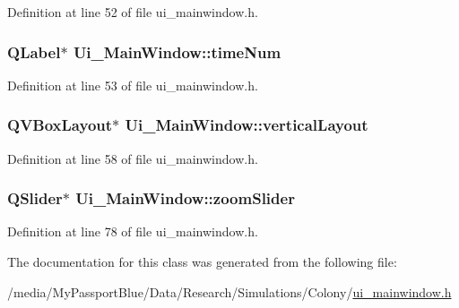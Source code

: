 \-Definition at line 52 of file ui\-\_\-mainwindow.\-h.

\hypertarget{class_ui___main_window_a260f2ffc3170b0afd4162f5300f7153e}{
\subsubsection[{time\-Num}]{\setlength{\rightskip}{0pt plus 5cm}\-Q\-Label$\ast$ {\bf \-Ui\-\_\-\-Main\-Window\-::time\-Num}}}\label{class_ui___main_window_a260f2ffc3170b0afd4162f5300f7153e}


\-Definition at line 53 of file ui\-\_\-mainwindow.\-h.

\hypertarget{class_ui___main_window_aecd96a04789fcfec3f98d80390ad8184}{
\subsubsection[{vertical\-Layout}]{\setlength{\rightskip}{0pt plus 5cm}\-Q\-V\-Box\-Layout$\ast$ {\bf \-Ui\-\_\-\-Main\-Window\-::vertical\-Layout}}}\label{class_ui___main_window_aecd96a04789fcfec3f98d80390ad8184}


\-Definition at line 58 of file ui\-\_\-mainwindow.\-h.

\hypertarget{class_ui___main_window_a396d443a9748adbeed2928fce39034a2}{
\subsubsection[{zoom\-Slider}]{\setlength{\rightskip}{0pt plus 5cm}\-Q\-Slider$\ast$ {\bf \-Ui\-\_\-\-Main\-Window\-::zoom\-Slider}}}\label{class_ui___main_window_a396d443a9748adbeed2928fce39034a2}


\-Definition at line 78 of file ui\-\_\-mainwindow.\-h.



\-The documentation for this class was generated from the following file\-:\begin{DoxyCompactItemize}
\item 
/media/\-My\-Passport\-Blue/\-Data/\-Research/\-Simulations/\-Colony/\hyperlink{ui__mainwindow_8h}{ui\-\_\-mainwindow.\-h}\end{DoxyCompactItemize}
